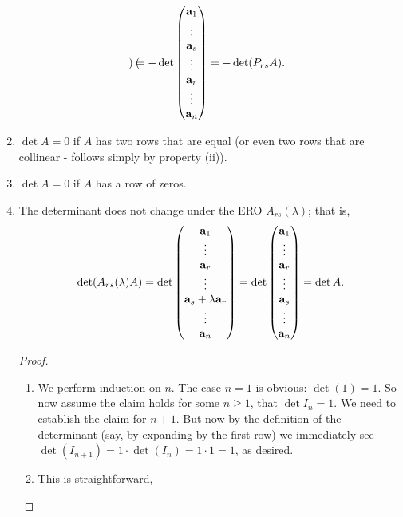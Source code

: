 \documentclass[10pt, a4paper]{article}
\begin{document}
\begin{enumerate}[label = (\roman*)]
\[\begin{pmatrix}
    \end{pmatrix}
    = -\det\begin{pmatrix}
        \mathbf{a}_1 \\ \vdots \\ \mathbf{a}_s \\ \vdots \\ \mathbf{a}_r \\ \vdots \\ \mathbf{a}_n
    \end{pmatrix}
    =
    -\det(P_{rs}A).
    \]
    \item $\det A = 0$ if $A$ has two rows that are equal
    (or even two rows that are collinear - follows simply by property (ii)).
    \item $\det A = 0$ if $A$ has a row of zeros.
    \item The determinant does not change under the ERO $A_{rs}(\lambda)$; that is,
    \[
    \det(A_{rs}(\lambda)A) = \det\begin{pmatrix}
        \mathbf{a}_1 \\ \vdots \\ \mathbf{a}_r \\ \vdots \\ \mathbf{a}_s + \lambda\mathbf{a}_r \\ \vdots \\ \mathbf{a}_n
    \end{pmatrix}
    =
    \det\begin{pmatrix}
        \mathbf{a}_1 \\ \vdots \\ \mathbf{a}_r \\ \vdots \\ \mathbf{a}_s \\ \vdots \\ \mathbf{a}_n
    \end{pmatrix}
    = \det A.
    \]
    \begin{proof}
        \begin{enumerate}[label = (\roman*)]
            \item We perform induction on $n$.
            The case $n = 1$ is obvious:
            $\det(1) = 1$.
            So now assume the claim holds for some $n \geq 1$,
            that $\det I_n = 1$.
            We need to establish the claim for $n + 1$.
            But now by the definition of the determinant
            (say, by expanding by the first row)
            we immediately see $\det(I_{n + 1}) = 1\cdot\det(I_n) = 1 \cdot 1 = 1$,
            as desired.
            \item This is straightforward,

\end{enumerate}
\end{proof}
\end{enumerate}
\end{document}

